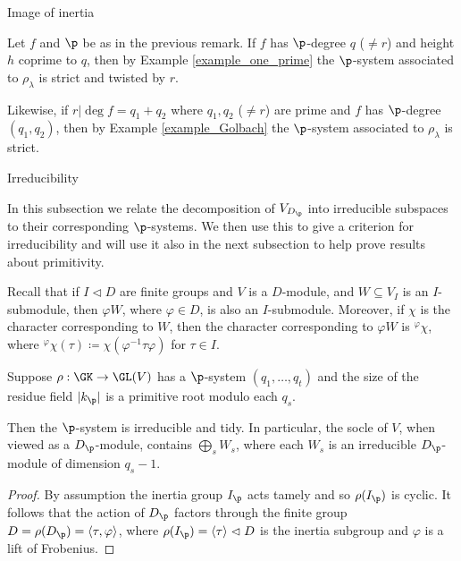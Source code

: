 \documentclass[11pt,a4paper]{article}
\begin{document}
\begin{section}{Image of inertia}
\begin{remark}
\label{remark_p_degree_and_strict_p-systems}
Let $f$ and $\p$ be as in the previous remark. If $f$ has $\p$-degree $q$ ($\neq r$) and height $h$ coprime to $q$, then by Example \ref{example_one_prime} the $\p$-system associated to $\rho_\lambda$ is strict and twisted by $r$.


Likewise, if $r|\deg f = q_1 +q_2$ where $q_1,q_2$ ($\neq r$) are prime and $f$ has $\p$-degree $(q_1,q_2)$, then by Example \ref{example_Golbach} the $\p$-system associated to $\rho_\lambda$ is strict.
\end{remark}

\begin{subsection}{Irreducibility}
    
In this subsection we relate the decomposition of $V_{D_\p}$ into irreducible subspaces to their corresponding $\p$-systems.
We then use this to give a criterion for irreducibility and will use it also in the next subsection to help prove results about primitivity.


Recall that if $I \vartriangleleft D$ are finite groups and $V$ is a $D$-module, and $W \subseteq V_I$ is an $I$-submodule, then $\varphi W$, where $\varphi \in D$, is also an $I$-submodule.
Moreover, if $\chi$ is the character corresponding to $W$, then the character corresponding to $\varphi W$ is $^\varphi\chi$, where $^\varphi\chi(\tau) \coloneqq \chi(\varphi^{-1}\tau \varphi)$ for $\tau \in I$.
\begin{proposition}
\label{irred_blocks_aux_Anni_VladDok}
Suppose $\rho: \GK \rightarrow \GL(V)$ has a $\p$-system  $(q_1, \ldots, q_t)$ and the size of the residue field $|k_\p|$ is a primitive root modulo each $q_s$.

Then the $\p$-system is irreducible and tidy.
In particular, the socle of $V$, when viewed as a $D_\p$-module, contains $\bigoplus_{s} W_s$, where each $W_s$ is an irreducible $D_\p$-module of dimension $q_s-1$.  

\end{proposition}

\begin{proof}
By assumption the inertia group $I_\p$ acts tamely and so $\rho(I_\p)$ is cyclic. It follows that the action of $D_\p$ factors through the finite group $D = \rho(D_\p) = \langle \tau , \varphi \rangle$, where $\rho(I_\p) = \langle \tau \rangle \vartriangleleft D$ is the inertia subgroup and $\varphi$ is a lift of Frobenius.




\end{proof}
\end{subsection}
\end{section}
\end{document}
